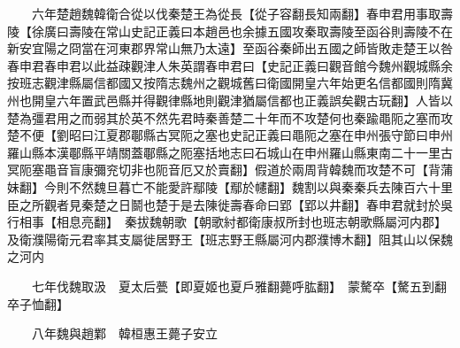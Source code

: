 　　六年楚趙魏韓衛合從以伐秦楚王為從長【從子容翻長知兩翻】春申君用事取壽陵【徐廣曰壽陵在常山史記正義曰本趙邑也余據五國攻秦取壽陵至函谷則壽陵不在新安宜陽之冏當在河東郡界常山無乃太遠】至函谷秦師出五國之師皆敗走楚王以咎春申君春申君以此益疎觀津人朱英謂春申君曰【史記正義曰觀音館今魏州觀城縣余按班志觀津縣屬信都國又按隋志魏州之觀城舊曰衛國開皇六年始更名信都國則隋冀州也開皇六年置武邑縣并得觀律縣地則觀津猶屬信都也正義誤矣觀古玩翻】人皆以楚為彊君用之而弱其於英不然先君時秦善楚二十年而不攻楚何也秦踰黽阨之塞而攻楚不便【劉昭曰江夏郡鄳縣古冥阨之塞也史記正義曰黽阨之塞在申州張守節曰申州羅山縣本漢鄳縣平靖關蓋鄳縣之阨塞括地志曰石城山在申州羅山縣東南二十一里古冥阨塞黽音盲康彌兖切非也阨音厄又於賣翻】假道於兩周背韓魏而攻楚不可【背蒲妹翻】今則不然魏旦暮亡不能愛許鄢陵【鄢於幰翻】魏割以與秦秦兵去陳百六十里臣之所觀者見秦楚之日鬬也楚于是去陳徙壽春命曰郢【郢以井翻】春申君就封於吳行相事【相息亮翻】　秦拔魏朝歌【朝歌紂都衛康叔所封也班志朝歌縣屬河内郡】及衛濮陽衛元君率其支屬徙居野王【班志野王縣屬河内郡濮博木翻】阻其山以保魏之河内

　　七年伐魏取汲　夏太后甍【即夏姬也夏戶雅翻薨呼肱翻】　蒙驁卒【驁五到翻卒子恤翻】

　　八年魏與趙鄴　韓桓惠王薨子安立


